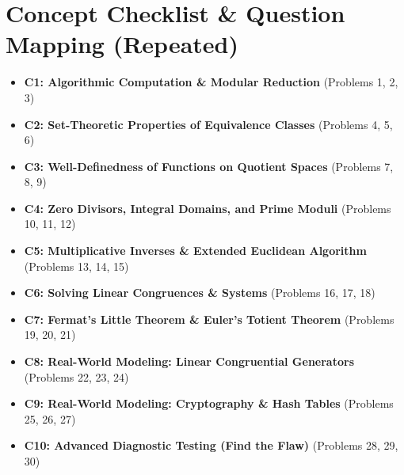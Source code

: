 \documentclass[11pt, a4paper]{article}
\theoremstyle{definition}
\theoremstyle{remark}
\begin{document}
\section{Concept Checklist \& Question Mapping (Repeated)}
\label{sec:checklist_end}
\begin{itemize}
    \item \textbf{C1: Algorithmic Computation \& Modular Reduction} (Problems 1, 2, 3)
    \item \textbf{C2: Set-Theoretic Properties of Equivalence Classes} (Problems 4, 5, 6)
    \item \textbf{C3: Well-Definedness of Functions on Quotient Spaces} (Problems 7, 8, 9)
    \item \textbf{C4: Zero Divisors, Integral Domains, and Prime Moduli} (Problems 10, 11, 12)
    \item \textbf{C5: Multiplicative Inverses \& Extended Euclidean Algorithm} (Problems 13, 14, 15)
    \item \textbf{C6: Solving Linear Congruences \& Systems} (Problems 16, 17, 18)
    \item \textbf{C7: Fermat's Little Theorem \& Euler's Totient Theorem} (Problems 19, 20, 21)
    \item \textbf{C8: Real-World Modeling: Linear Congruential Generators} (Problems 22, 23, 24)
    \item \textbf{C9: Real-World Modeling: Cryptography \& Hash Tables} (Problems 25, 26, 27)
    \item \textbf{C10: Advanced Diagnostic Testing (Find the Flaw)} (Problems 28, 29, 30)
\end{itemize}
\end{document}
